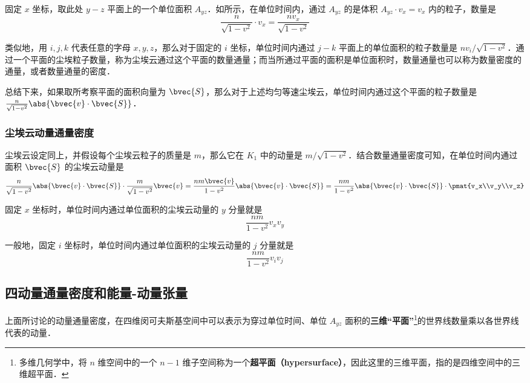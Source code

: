 固定 $x$ 坐标，取此处 $y-z$ 平面上的一个单位面积 $A_{yz}$．如所示，在单位时间内，通过 $A_{yz}$ 的是体积 $A_{yz}\cdot v_x=v_x$ 内的粒子，数量是
\begin{equation}
\frac{n}{\sqrt{1-v^2}}\cdot v_x=\frac{nv_x}{\sqrt{1-v^2}}
\end{equation}

类似地，用 $i, j, k$ 代表任意的字母 $x, y, z$，那么对于固定的 $i$ 坐标，单位时间内通过 $j-k$ 平面上的单位面积的粒子数量是 $nv_i/\sqrt{1-v^2}$．通过一个平面的尘埃粒子数量，称为尘埃云通过这个平面的数量通量；而当所通过平面的面积是单位面积时，数量通量也可以称为数量密度的通量，或者数量通量的密度．

总结下来，如果取所考察平面的面积向量为 $\bvec{S}$，那么对于上述均匀等速尘埃云，单位时间内通过这个平面的粒子数量是 $\frac{n}{\sqrt{1-v^2}}\abs{\bvec{v}\cdot\bvec{S}}$．

\subsubsection{尘埃云动量通量密度}

尘埃云设定同上，并假设每个尘埃云粒子的质量是 $m$，那么它在 $K_1$ 中的动量是 $m/\sqrt{1-v^2}$．结合数量通量密度可知，在单位时间内通过面积 $\bvec{S}$ 的尘埃云动量是
\begin{equation}
\frac{n}{\sqrt{1-v^2}}\abs{\bvec{v}\cdot\bvec{S}}\cdot\frac{m}{\sqrt{1-v^2}}\bvec{v}=\frac{nm\bvec{v}}{1-v^2}\abs{\bvec{v}\cdot\bvec{S}}=\frac{nm}{1-v^2}\abs{\bvec{v}\cdot\bvec{S}}\cdot\pmat{v_x\\v_y\\v_z}
\end{equation}

固定 $x$ 坐标时，单位时间内通过单位面积的尘埃云动量的 $y$ 分量就是
\begin{equation}
\frac{nm}{1-v^2}v_xv_y
\end{equation}

一般地，固定 $i$ 坐标时，单位时间内通过单位面积的尘埃云动量的 $j$ 分量就是
\begin{equation}\label{SRFld_eq1}
\frac{nm}{1-v^2}v_iv_j
\end{equation}

\subsection{四动量通量密度和能量-动量张量}

上面所讨论的动量通量密度，在四维闵可夫斯基空间中可以表示为穿过单位时间、单位 $A_{yz}$ 面积的\textbf{三维“平面”}\footnote{多维几何学中，将 $n$ 维空间中的一个 $n-1$ 维子空间称为一个\textbf{超平面（hypersurface）}，因此这里的三维平面，指的是四维空间中的三维超平面．}的世界线数量乘以各世界线代表的动量．

